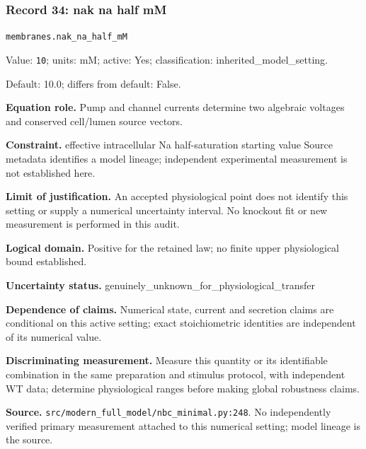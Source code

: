 \subsubsection*{Record 34: nak na half mM}
{\small \nolinkurl{membranes.nak_na_half_mM}\par

Value: \texttt{10}; units: mM; active: Yes; classification: inherited\_model\_setting.\par

Default: 10.0; differs from default: False.\par

\textbf{Equation role.} Pump and channel currents determine two algebraic voltages and conserved cell/lumen source vectors.\par

\textbf{Constraint.} effective intracellular Na half-saturation starting value Source metadata identifies a model lineage; independent experimental measurement is not established here.\par

\textbf{Limit of justification.} An accepted physiological point does not identify this setting or supply a numerical uncertainty interval. No knockout fit or new measurement is performed in this audit.\par

\textbf{Logical domain.} Positive for the retained law; no finite upper physiological bound established.\par

\textbf{Uncertainty status.} genuinely\_unknown\_for\_physiological\_transfer\par

\textbf{Dependence of claims.} Numerical state, current and secretion claims are conditional on this active setting; exact stoichiometric identities are independent of its numerical value.\par

\textbf{Discriminating measurement.} Measure this quantity or its identifiable combination in the same preparation and stimulus protocol, with independent WT data; determine physiological ranges before making global robustness claims.\par

\textbf{Source.} \nolinkurl{src/modern_full_model/nbc_minimal.py:248}. No independently verified primary measurement attached to this numerical setting; model lineage is the source.\par}

